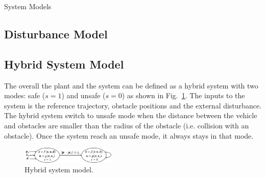 \begin{section}{System Models}
 \subsection{Disturbance Model}
 
\subsection{Hybrid System Model}
The overall the plant and the system can be defined as a hybrid system with two modes: safe ($ s = 1 $) and unsafe ($ s = 0 $) as shown in Fig.~\ref{fig:hybrid_model}. The inputs to the system is the reference trajectory, obstacle positions and the external disturbance. The hybrid system switch to unsafe mode when the distance between the vehicle and obstacles are smaller than the radius of the obstacle (i.e. collision with an obstacle). Once the system reach an unsafe mode, it always stays in that mode. 
\begin{figure}[h]
	\centering
	\includegraphics[width=0.4\textwidth]{figures/hybrid_system}
	\caption{Hybrid system model.}
	\label{fig:hybrid_model}
\end{figure}



\end{section}